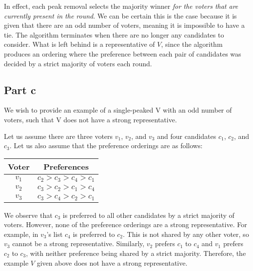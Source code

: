 \documentclass[12pt]{article}%
\begin{document}
In effect, each peak removal selects the majority winner \emph{for the voters that are currently present in the round}. We can be certain this is the case because it is given that there are an odd number of voters, meaning it is impossible to have a tie. The algorithm terminates when there are no longer any candidates to consider. What is left behind is a representative of $V$, since the algorithm produces an ordering where the preference between each pair of candidates was decided by a strict majority of voters each round.

\subsection*{Part c}
We wish to provide an example of a single-peaked V with an odd number of voters, such that V does not have a strong representative.

Let us assume there are three voters $v_1$, $v_2$, and $v_3$ and four candidates $c_1$, $c_2$,  and $c_3$. Let us also assume that the preference orderings are as follows:

\begin{center}
\begin{tabular}{|c|c|}
\hline
Voter & Preferences             \\ \hline
$v_1$ & $c_2 > c_3 > c_4 > c_1$ \\ \hline
$v_2$ & $c_3 > c_2 > c_1 > c_4$ \\ \hline
$v_3$ & $c_3 > c_4 > c_2 > c_1$ \\ \hline
\end{tabular}
\end{center}

We observe that $c_3$ is preferred to all other candidates by a strict majority of voters. However, none of the preference orderings are a strong representative. For example, in $v_3$'s list $c_4$ is preferred to $c_2$. This is not shared by any other voter, so $v_3$ cannot be a strong representative. Similarly, $v_2$ prefers $c_1$ to $c_4$ and $v_1$ prefers $c_2$ to $c_3$, with neither preference being shared by a strict majority. Therefore, the example $V$ given above does not have a strong representative.
\end{document}
